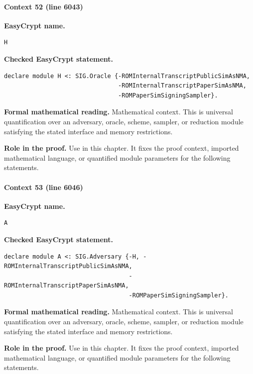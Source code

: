 \paragraph{Context 52 (line 6043)}
\noindent\textbf{EasyCrypt name.}
\begin{lstlisting}[language=EasyCrypt,basicstyle=\ttfamily\scriptsize]
H
\end{lstlisting}
\noindent\textbf{Checked EasyCrypt statement.}
\begin{lstlisting}[language=EasyCrypt,basicstyle=\ttfamily\scriptsize]
declare module H <: SIG.Oracle {-ROMInternalTranscriptPublicSimAsNMA,
                                -ROMInternalTranscriptPaperSimAsNMA,
                                -ROMPaperSimSigningSampler}.
\end{lstlisting}
\noindent\textbf{Formal mathematical reading.}
Mathematical context. This is universal quantification over an adversary, oracle, scheme, sampler, or reduction module satisfying the stated interface and memory restrictions.

\noindent\textbf{Role in the proof.}
Use in this chapter. It fixes the proof context, imported mathematical language, or quantified module parameters for the following statements.

\paragraph{Context 53 (line 6046)}
\noindent\textbf{EasyCrypt name.}
\begin{lstlisting}[language=EasyCrypt,basicstyle=\ttfamily\scriptsize]
A
\end{lstlisting}
\noindent\textbf{Checked EasyCrypt statement.}
\begin{lstlisting}[language=EasyCrypt,basicstyle=\ttfamily\scriptsize]
declare module A <: SIG.Adversary {-H, -ROMInternalTranscriptPublicSimAsNMA,
                                   -ROMInternalTranscriptPaperSimAsNMA,
                                   -ROMPaperSimSigningSampler}.
\end{lstlisting}
\noindent\textbf{Formal mathematical reading.}
Mathematical context. This is universal quantification over an adversary, oracle, scheme, sampler, or reduction module satisfying the stated interface and memory restrictions.

\noindent\textbf{Role in the proof.}
Use in this chapter. It fixes the proof context, imported mathematical language, or quantified module parameters for the following statements.


